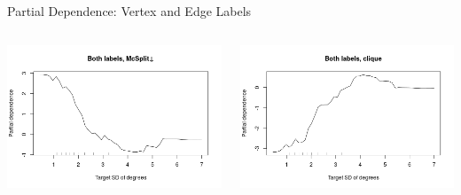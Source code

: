 \documentclass{beamer}
\begin{document}
\begin{frame}{Partial Dependence: Vertex and Edge Labels}
  \begin{columns}
    \begin{column}{0.5\textwidth}
      \centering
      \includegraphics[width=\textwidth,height=0.4\textheight,keepaspectratio]{../dissertation/images/both_labels_mcsplitdown_stddeg.png}
    \end{column}
    \begin{column}{0.5\textwidth}
      \centering
      \includegraphics[width=\textwidth,height=0.4\textheight,keepaspectratio]{../dissertation/images/both_labels_clique_stddeg.png}

\end{column}
\end{columns}
\end{frame}
\end{document}
